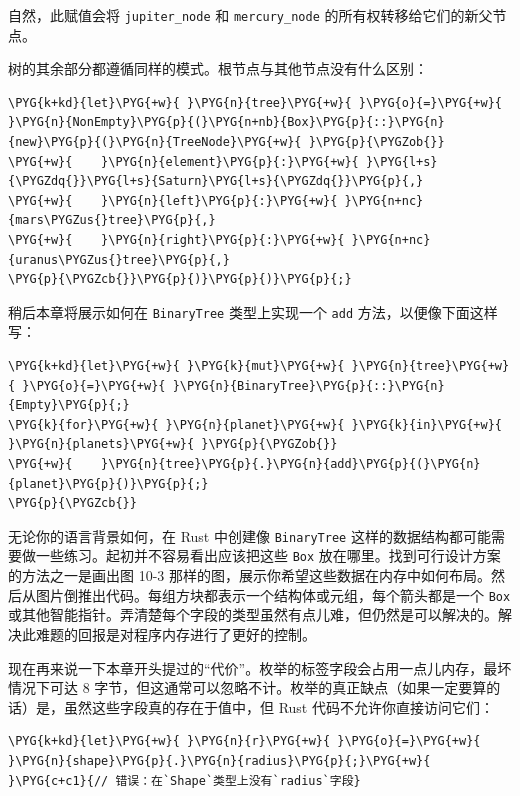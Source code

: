 自然，此赋值会将 \texttt{jupiter\_node} 和 \texttt{mercury\_node} 的所有权转移给它们的新父节点。

树的其余部分都遵循同样的模式。根节点与其他节点没有什么区别：

\begin{Verbatim}[commandchars=\\\{\},breaklines=true,breakanywhere=true,fontsize=\codefont,xleftmargin=17bp]
\PYG{k+kd}{let}\PYG{+w}{ }\PYG{n}{tree}\PYG{+w}{ }\PYG{o}{=}\PYG{+w}{ }\PYG{n}{NonEmpty}\PYG{p}{(}\PYG{n+nb}{Box}\PYG{p}{::}\PYG{n}{new}\PYG{p}{(}\PYG{n}{TreeNode}\PYG{+w}{ }\PYG{p}{\PYGZob{}}
\PYG{+w}{    }\PYG{n}{element}\PYG{p}{:}\PYG{+w}{ }\PYG{l+s}{\PYGZdq{}}\PYG{l+s}{Saturn}\PYG{l+s}{\PYGZdq{}}\PYG{p}{,}
\PYG{+w}{    }\PYG{n}{left}\PYG{p}{:}\PYG{+w}{ }\PYG{n+nc}{mars\PYGZus{}tree}\PYG{p}{,}
\PYG{+w}{    }\PYG{n}{right}\PYG{p}{:}\PYG{+w}{ }\PYG{n+nc}{uranus\PYGZus{}tree}\PYG{p}{,}
\PYG{p}{\PYGZcb{}}\PYG{p}{)}\PYG{p}{)}\PYG{p}{;}
\end{Verbatim}

稍后本章将展示如何在 \texttt{BinaryTree} 类型上实现一个 \texttt{add} 方法，以便像下面这样写：

\begin{Verbatim}[commandchars=\\\{\},breaklines=true,breakanywhere=true,fontsize=\codefont,xleftmargin=17bp]
\PYG{k+kd}{let}\PYG{+w}{ }\PYG{k}{mut}\PYG{+w}{ }\PYG{n}{tree}\PYG{+w}{ }\PYG{o}{=}\PYG{+w}{ }\PYG{n}{BinaryTree}\PYG{p}{::}\PYG{n}{Empty}\PYG{p}{;}
\PYG{k}{for}\PYG{+w}{ }\PYG{n}{planet}\PYG{+w}{ }\PYG{k}{in}\PYG{+w}{ }\PYG{n}{planets}\PYG{+w}{ }\PYG{p}{\PYGZob{}}
\PYG{+w}{    }\PYG{n}{tree}\PYG{p}{.}\PYG{n}{add}\PYG{p}{(}\PYG{n}{planet}\PYG{p}{)}\PYG{p}{;}
\PYG{p}{\PYGZcb{}}
\end{Verbatim}

无论你的语言背景如何，在 Rust 中创建像 \texttt{BinaryTree} 这样的数据结构都可能需要做一些练习。起初并不容易看出应该把这些 \texttt{Box} 放在哪里。找到可行设计方案的方法之一是画出图 10-3 那样的图，展示你希望这些数据在内存中如何布局。然后从图片倒推出代码。每组方块都表示一个结构体或元组，每个箭头都是一个 \texttt{Box} 或其他智能指针。弄清楚每个字段的类型虽然有点儿难，但仍然是可以解决的。解决此难题的回报是对程序内存进行了更好的控制。

现在再来说一下本章开头提过的“代价”。枚举的标签字段会占用一点儿内存，最坏情况下可达 8 字节，但这通常可以忽略不计。枚举的真正缺点（如果一定要算的话）是，虽然这些字段真的存在于值中，但 Rust 代码不允许你直接访问它们：

\begin{Verbatim}[commandchars=\\\{\},breaklines=true,breakanywhere=true,fontsize=\codefont,xleftmargin=17bp]
\PYG{k+kd}{let}\PYG{+w}{ }\PYG{n}{r}\PYG{+w}{ }\PYG{o}{=}\PYG{+w}{ }\PYG{n}{shape}\PYG{p}{.}\PYG{n}{radius}\PYG{p}{;}\PYG{+w}{  }\PYG{c+c1}{// 错误：在`Shape`类型上没有`radius`字段}
\end{Verbatim}

